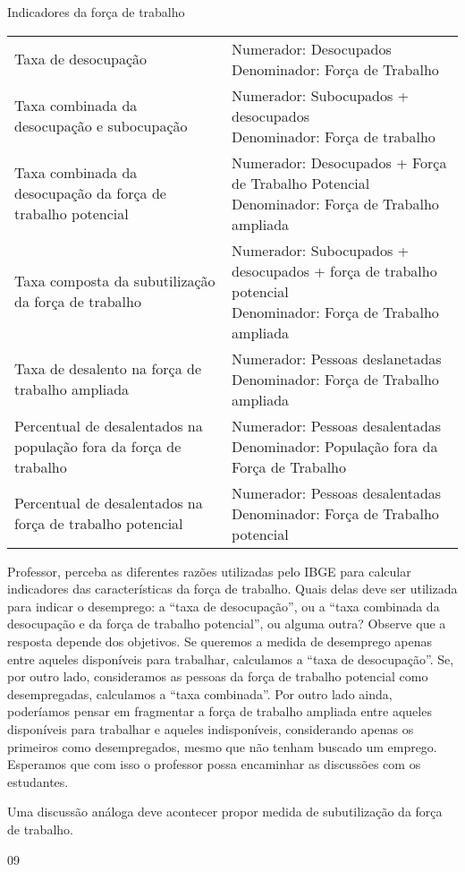\begin{sugestions}{Indicadores da força de trabalho}
{\begin{table}[H]
  \begin{tabu} to 
  \hline
   &  \\
  \hline
  Taxa de desocupação & \parbox{\linewidth}{Numerador: Desocupados \\ Denominador: Força de Trabalho} \\
  \hline
  Taxa combinada da desocupação e subocupação & \parbox{\linewidth}{Numerador: Subocupados + desocupados \\ Denominador: Força de trabalho} \\
  \hline
  Taxa combinada da desocupação da força de trabalho potencial & \parbox{\linewidth}{Numerador: Desocupados + Força de Trabalho Potencial  \\ Denominador: Força de Trabalho ampliada} \\
  \hline
  Taxa composta da subutilização da força de trabalho & \parbox{\linewidth}{Numerador: Subocupados + desocupados + força de trabalho potencial \\ Denominador: Força de Trabalho ampliada} \\
  \hline
  Taxa de desalento na força de trabalho ampliada & \parbox{\linewidth}{Numerador: Pessoas deslanetadas \\ Denominador: Força de Trabalho ampliada} \\
  \hline
  Percentual de desalentados na população fora da força de trabalho & \parbox{\linewidth}{Numerador: Pessoas desalentadas \\ Denominador: População fora da Força de Trabalho} \\
  \hline
  Percentual de desalentados na força de trabalho potencial & \parbox{\linewidth}{Numerador: Pessoas desalentadas \\ Denominador: Força de Trabalho potencial} \\
  \hline
  \end{tabu}
  \end{table}

  Professor, perceba as diferentes razões utilizadas pelo IBGE para calcular indicadores das características da força de trabalho. Quais delas deve ser utilizada para indicar o desemprego: a “taxa de desocupação”, ou a “taxa combinada da desocupação e da força de trabalho potencial”, ou alguma outra? Observe que a resposta depende dos objetivos. Se queremos a medida de desemprego apenas entre aqueles disponíveis para trabalhar, calculamos a “taxa de desocupação”. Se, por outro lado, consideramos as pessoas da força de trabalho potencial como desempregadas, calculamos a “taxa combinada”. Por outro lado ainda, poderíamos pensar em fragmentar a força de trabalho ampliada entre aqueles disponíveis para trabalhar e aqueles indisponíveis, considerando apenas os primeiros como desempregados, mesmo que não tenham buscado um emprego. Esperamos que com isso o professor possa encaminhar as discussões com os estudantes.

  Uma discussão análoga deve acontecer propor medida de subutilização da força de trabalho.

}{0}{9}
\end{sugestions}

